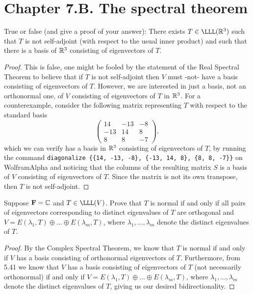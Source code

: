 \section*{Chapter 7.B. The spectral theorem}


\begin{exercise}{1}
  True or false (and give a proof of your answer): There exists $T\in\LLL(\R^3)$ such that $T$ is not self-adjoint (with respect to the usual inner product) and such that there is a basis of $\mathbb{R}^3$ consisting of eigenvectors of $T$.
\end{exercise}
\begin{proof}
 This is false, one might be fooled by the statement of the Real Spectral Theorem to believe that if $T$ is not self-adjoint then $V$ must -not- have a basis consisting of eigenvectors of $T$. However, we are interested in just a basis, not an orthonormal one, of $V$ consisting of eigenvectors of $T$ in $\mathbb{R}^3$. For a counterexample, consider the following matrix representing $T$ with respect to the standard basis
 \[
 \begin{pmatrix}
     14& -13& -8\\
     -13& 14& 8\\
     8& 8& -7
 \end{pmatrix},
 \]
 which we can verify has a basis in $\mathbb{R}^3$ consisting of eigenvectors of $T$, by running the command \verb|diagonalize {{14, -13, -8}, {-13, 14, 8}, {8, 8, -7}}| on WolframAlpha and noticing that the columns of the resulting matrix $S$ is a basis of $V$ consisting of eigenvectors of $T$. Since the matrix is not its own transpose, then $T$ is not self-adjoint.
\end{proof}

\begin{exercise}{4}
  Suppose $\mathbf{F}=\mathbb{C}$ and $T\in\LLL(V)$. Prove that $T$ is normal if and only if all pairs of eigenvectors corresponding to distinct eigenvalues of $T$ are orthogonal and $V =E(\lambda_1,T)\oplus\dots\oplus E(\lambda_m,T)$, where $\lambda_1,\dots,\lambda_m$ denote the distinct eigenvalues of $T$.
\end{exercise}
\begin{proof}
 By the Complex Spectral Theorem, we know that $T$ is normal if and only if $V$ has a basis consisting of orthonormal eigenvectors of $T$. Furthermore, from 5.41 we know that $V$ has a basis consisting of eigenvectors of $T$ (not necessarily orthonormal) if and only if $V =E(\lambda_1,T)\oplus\dots\oplus E(\lambda_m,T)$, where $\lambda_1,\dots,\lambda_m$ denote the distinct eigenvalues of $T$, giving us our desired bidirectionality.
\end{proof}

